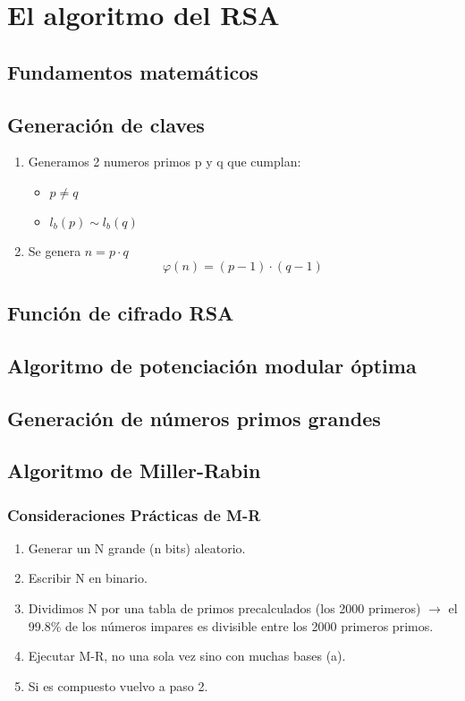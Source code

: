 \section{El algoritmo del RSA}

\subsection{Fundamentos matemáticos}
\subsection{ Generación de claves}
\begin{enumerate}
	\item Generamos 2 numeros primos p y q que cumplan:
	\begin{itemize}
		\item $p\neq q$
		\item $l_b(p)\sim l_b(q)$
	\end{itemize}
	\item Se genera $n = p\cdot q$
	$$\varphi(n) = (p-1)\cdot(q-1)$$
\end{enumerate}
\subsection{Función de cifrado RSA}
\subsection{Algoritmo de potenciación modular óptima}
\subsection{Generación de números primos grandes}
\subsection{Algoritmo de Miller-Rabin}

\subsubsection{Consideraciones Prácticas de M-R}
\begin{enumerate}
	\item Generar un N grande (n bits) aleatorio.
	\item Escribir N en binario.
	\item Dividimos N por una tabla de primos precalculados (los 2000 primeros) $\rightarrow$ el 99.8\% de los números impares es divisible entre los 2000 primeros primos.
	\item Ejecutar M-R, no una sola vez sino con muchas bases (a).
	\item Si es compuesto vuelvo a paso 2.
	
\end{enumerate}

